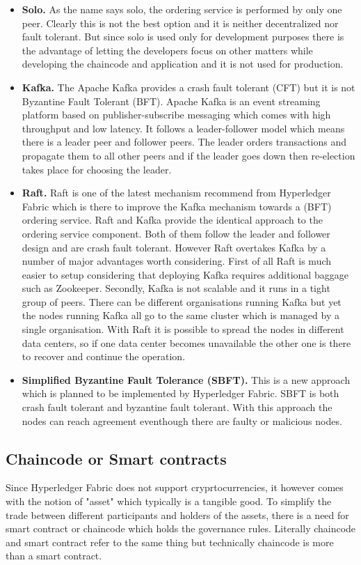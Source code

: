 \begin{itemize}
  \item \textbf{Solo.}  As the name says solo, the ordering service is performed by only one peer. Clearly this is not the best option and it is neither decentralized  nor fault tolerant. But since solo is used only for development purposes there is the advantage of letting the developers focus on other matters while developing the chaincode and application and it is not used for production. 
 \item \textbf{Kafka.} The Apache Kafka provides a crash fault tolerant (CFT) but it is not Byzantine Fault Tolerant (BFT). Apache Kafka is an event streaming platform based on publisher-subscribe messaging which comes with high throughput and low latency. It follows a leader-follower model which means there is a leader peer and follower peers. The leader orders transactions and propagate them to all other peers and if the leader goes down then re-election takes place for choosing the leader. 
 \item \textbf{Raft.} Raft is one of the latest mechanism recommend from Hyperledger Fabric which is there to improve the Kafka mechanism towards a (BFT) ordering service. Raft and Kafka provide the identical approach to the ordering service component. Both of them follow the leader and follower design and are crash fault tolerant. However Raft overtakes Kafka by a number of major advantages worth considering. First of all Raft is much easier to setup considering that deploying Kafka requires additional baggage such as Zookeeper. Secondly, Kafka is not scalable and it runs in a tight group of peers. There can be different organisations running Kafka but yet the nodes running Kafka all go to the same cluster which is managed by a single organisation. With Raft it is possible to spread the nodes in different data centers, so if one data center becomes unavailable the other one is there to recover and continue the operation.

 
 \item \textbf{Simplified Byzantine Fault Tolerance (SBFT).} This is a new approach which is planned to be implemented by Hyperledger Fabric. SBFT is both crash fault tolerant and byzantine fault tolerant. With this approach the nodes can reach agreement eventhough there are faulty or malicious nodes. 
\end{itemize}

\subsection{Chaincode or Smart contracts}
Since Hyperledger Fabric does not support cryprtocurrencies, it however comes with the notion of "asset" which typically is a tangible good. To simplify the trade between different participants and holders of the assets, there is a need for smart contract or chaincode which holds the governance rules. Literally chaincode and smart contract refer to the same thing but technically chaincode is more than a smart contract. 

